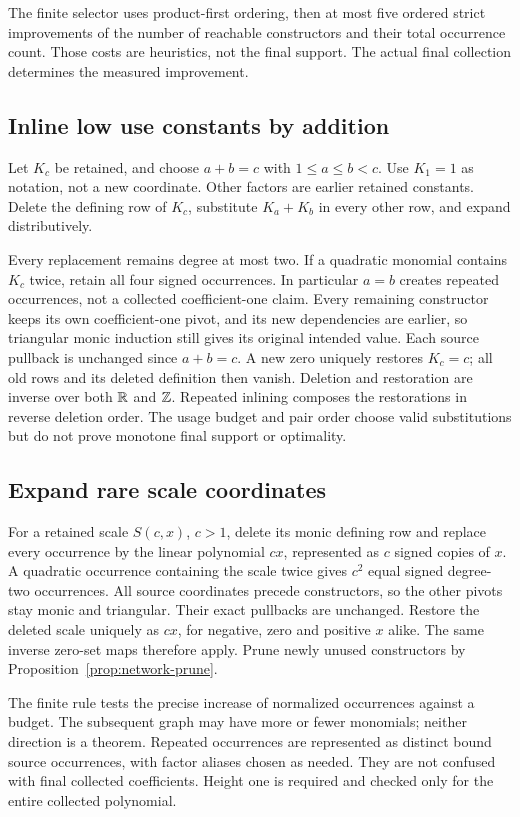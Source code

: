 The finite selector uses product-first ordering, then at most five ordered
strict improvements of the number of reachable constructors and their total
occurrence count. Those costs are heuristics, not the final support. The
actual final collection determines the measured improvement.

\subsection{Inline low use constants by addition}
Let $K_c$ be retained, and choose $a+b=c$ with $1\le a\le b<c$.
Use $K_1=1$ as notation, not a new coordinate. Other factors are earlier
retained constants. Delete the defining row of $K_c$, substitute $K_a+K_b$
in every other row, and expand distributively.

Every replacement remains degree at most two. If a quadratic monomial
contains $K_c$ twice, retain all four signed occurrences. In particular
$a=b$ creates repeated occurrences, not a collected coefficient-one claim.
Every remaining constructor keeps its own coefficient-one pivot, and its
new dependencies are earlier, so triangular monic induction still gives its
original intended value. Each source pullback is unchanged since $a+b=c$.
A new zero uniquely restores $K_c=c$; all old rows and its deleted definition
then vanish. Deletion and restoration are inverse over both $\mathbb R$ and $\mathbb Z$.
Repeated inlining composes the restorations in reverse deletion order.
The usage budget and pair order choose valid substitutions but do not prove
monotone final support or optimality.

\subsection{Expand rare scale coordinates}
For a retained scale $S(c,x)$, $c>1$, delete its monic defining row and
replace every occurrence by the linear polynomial $cx$, represented as
$c$ signed copies of $x$. A quadratic occurrence containing the scale
twice gives $c^2$ equal signed degree-two occurrences. All source coordinates
precede constructors, so the other pivots stay monic and triangular.
Their exact pullbacks are unchanged. Restore the deleted scale uniquely as
$cx$, for negative, zero and positive $x$ alike. The same inverse zero-set
maps therefore apply. Prune newly unused constructors by
Proposition~\ref{prop:network-prune}.

The finite rule tests the precise increase of normalized occurrences against
a budget. The subsequent graph may have more or fewer monomials; neither
direction is a theorem. Repeated occurrences are represented as distinct
bound source occurrences, with factor aliases chosen as needed. They are
not confused with final collected coefficients. Height one is required and
checked only for the entire collected polynomial.

